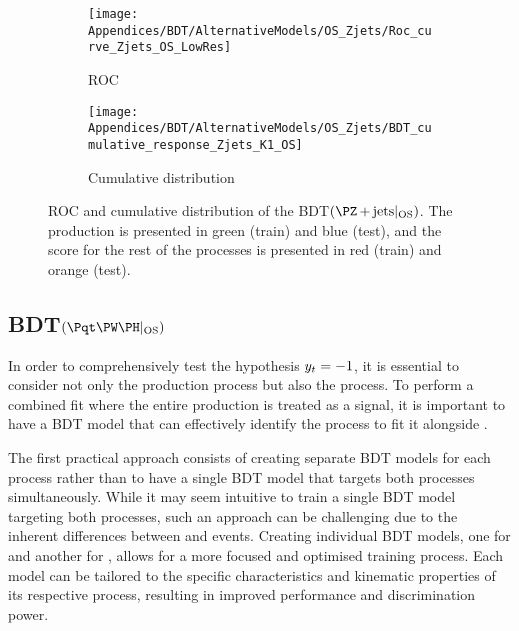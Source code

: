\begin{figure}[h]
\centering
\begin{subfigure}{.475\textwidth}
  \centering
  \texttt{[image: Appendices/BDT/AlternativeModels/OS\_Zjets/Roc\_curve\_Zjets\_OS\_LowRes]}
  \caption{ROC}
  \label{fig:BDT:AltModels:ZjetsOS:ROC}
\end{subfigure}%
\begin{subfigure}{.5\textwidth}
  \centering
  \texttt{[image: Appendices/BDT/AlternativeModels/OS\_Zjets/BDT\_cumulative\_response\_Zjets\_K1\_OS]}
  \caption{Cumulative distribution}
  \label{fig:BDT:AltModels:ZjetsOS:Score}
\end{subfigure}
\caption{ROC and cumulative distribution of the BDT$(\Zjets|_{\text{OS}})$.
The \Zjets production is presented in green (train) and blue (test), and the score for the rest of the processes
is presented in red (train) and orange (test).}
\label{fig:BDT:AltModels:Result:ZjetsOS}
\end{figure}



\subsection{BDT$(\tWH|_{\text{OS}})$}
\label{sec:BDT:AltModels:tWHOS}
In order to comprehensively test the hypothesis $y_{t} = -1$, it is essential to consider not only the \tHq production process but also the \tWH process. To perform a combined fit where the entire \tH production is treated as a signal, it is important to have a BDT model that can effectively identify the \tWH process to fit it alongside \tHq.

The first practical approach consists of creating separate BDT models for each process rather than to have a single 
BDT model that targets both processes simultaneously. While it may seem intuitive to train a single BDT model targeting both processes, 
such an approach can be challenging due to the inherent differences between \tHq and \tWH events. 
Creating individual BDT models, one for \tHq and another for \tWH, allows for a more focused and optimised training process. 
Each model can be tailored to the specific characteristics and kinematic properties of its respective process, resulting in improved 
performance and discrimination power.

